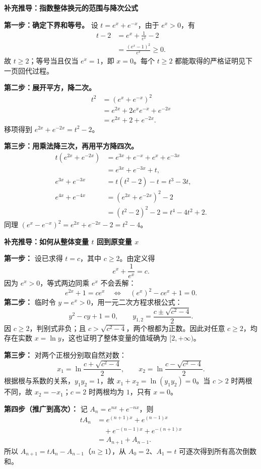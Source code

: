 \begin{proofbox}
\textbf{\textcolor{CProof}{补充推导：指数整体换元的范围与降次公式}}

\textbf{第一步：确定下界和等号。} 设 $t=e^x+e^{-x}$，由于 $e^x>0$，有
\[
\begin{aligned}
t-2&=e^x+\frac1{e^x}-2\\
&=\frac{(e^x-1)^2}{e^x}\ge0.
\end{aligned}
\]
故 $t\ge2$；等号当且仅当 $e^x=1$，即 $x=0$。每个 $t\ge2$ 都能取得的严格证明见下一页回代过程。

\textbf{第二步：展开平方，降二次。}
\[
\begin{aligned}
t^2&=(e^x+e^{-x})^2\\
&=e^{2x}+2e^xe^{-x}+e^{-2x}\\
&=e^{2x}+2+e^{-2x}.
\end{aligned}
\]
移项得到 $\boxed{e^{2x}+e^{-2x}=t^2-2}$。

\textbf{第三步：用乘法降三次，再用平方降四次。}
\[
\begin{aligned}
t(e^{2x}+e^{-2x})&=e^{3x}+e^{-x}+e^x+e^{-3x}\\
&=e^{3x}+e^{-3x}+t,\\
e^{3x}+e^{-3x}&=t(t^2-2)-t=t^3-3t,\\
e^{4x}+e^{-4x}&=(e^{2x}+e^{-2x})^2-2\\
&=(t^2-2)^2-2=t^4-4t^2+2.
\end{aligned}
\]
同理 $(e^x-e^{-x})^2=e^{2x}+e^{-2x}-2=t^2-4$。
\end{proofbox}
\clearpage
\begin{proofbox}
\textbf{\textcolor{CProof}{补充推导：如何从整体变量 $t$ 回到原变量 $x$}}

\textbf{第一步：} 设已求得 $t=c$，其中 $c\ge2$。由定义得
\[
e^x+\frac1{e^x}=c.
\]
因为 $e^x>0$，等式两边同乘 $e^x$ 不会丢解：
\[
e^{2x}+1=ce^x\quad\Longleftrightarrow\quad
(e^x)^2-ce^x+1=0.
\]
\textbf{第二步：} 临时令 $y=e^x>0$，用一元二次方程求根公式：
\[
y^2-cy+1=0,\qquad y_{1,2}=\frac{c\pm\sqrt{c^2-4}}2.
\]
因 $c\ge2$，判别式非负；且 $c>\sqrt{c^2-4}$，两个根都为正数。因此对任意 $c\ge2$，均存在实数 $x=\ln y$，这也证明了整体变量的值域确为 $[2,+\infty)$。

\textbf{第三步：} 对两个正根分别取自然对数：
\[
x_1=\ln\frac{c+\sqrt{c^2-4}}2,\qquad
x_2=\ln\frac{c-\sqrt{c^2-4}}2.
\]
根据根与系数的关系，$y_1y_2=1$，故
$x_1+x_2=\ln(y_1y_2)=0$。当 $c>2$ 时两根不同，故 $x_2=-x_1$；$c=2$ 时两根均为 $1$，只有 $x=0$。

\textbf{第四步（推广到高次）：} 记 $A_n=e^{nx}+e^{-nx}$，则
\[
\begin{aligned}
tA_n&=e^{(n+1)x}+e^{(n-1)x}\\
&\quad+e^{-(n-1)x}+e^{-(n+1)x}\\
&=A_{n+1}+A_{n-1}.
\end{aligned}
\]
所以 $A_{n+1}=tA_n-A_{n-1}$（$n\ge1$），从 $A_0=2$、$A_1=t$ 可逐次得到所有高次倒数和。
\end{proofbox}
\clearpage
